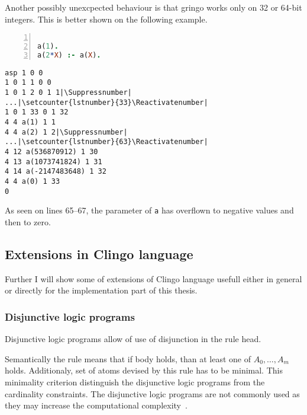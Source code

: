 \documentclass[
    digital,
    color,
    oneside,
    sansbold,
    lot,
    nolof
]{fithesis}
\begin{document}
Another possibly unexcpected behaviour is that gringo works only on 32 or
64-bit integers. This is better shown on the following example.

\begin{minipage}[t]{0.45\linewidth}
\centering
\begin{lstlisting}[language=prolog, numbers=left, countblanklines=false]

a(1).
a(2*X) :- a(X).
\end{lstlisting}
\end{minipage}
\hspace{1em}
\begin{minipage}[t]{0.45\linewidth}
\centering
\begin{lstlisting}[numbers=right, countblanklines=false]
asp 1 0 0
1 0 1 1 0 0
1 0 1 2 0 1 1|\Suppressnumber|
...|\setcounter{lstnumber}{33}\Reactivatenumber|
1 0 1 33 0 1 32
4 4 a(1) 1 1
4 4 a(2) 1 2|\Suppressnumber|
...|\setcounter{lstnumber}{63}\Reactivatenumber|
4 12 a(536870912) 1 30
4 13 a(1073741824) 1 31
4 14 a(-2147483648) 1 32
4 4 a(0) 1 33
0
\end{lstlisting}
\end{minipage}
As seen on lines 65--67, the parameter of \texttt{a} has overflown to negative
values and then to zero.

\subsection{Extensions in Clingo language}

Further I will show some of extensions of Clingo language usefull either
in general or directly for the implementation part of this thesis.

\subsubsection{Disjunctive logic programs}
Disjunctive logic programs allow of use of disjunction in the rule head.
{\setlength{\tabcolsep}{0.2em}%
\begin{center}
\end{center}}\noindent
Semantically the rule means that
if body holds, than at least one of $A_0, \dots, A_m$ holds. Additionaly, set
of atoms devised by this rule has to be minimal.
This minimality criterion distinguish the disjunctive logic programs from
the cardinality constraints.
The disjunctive logic programs are not commonly used as they may increase
the computational complexity~\cite{eiter1995computational}.
\end{document}
